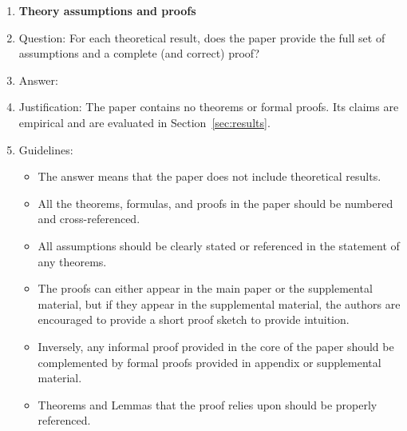 \begin{enumerate}
\begin{itemize}
        \item If applicable, the authors should discuss possible limitations of their approach to address problems of privacy and fairness.
        \item While the authors might fear that complete honesty about limitations might be used by reviewers as grounds for rejection, a worse outcome might be that reviewers discover limitations that aren't acknowledged in the paper. The authors should use their best judgment and recognize that individual actions in favor of transparency play an important role in developing norms that preserve the integrity of the community. Reviewers will be specifically instructed to not penalize honesty concerning limitations.
    \end{itemize}

\item {\bf Theory assumptions and proofs}
    \item[] Question: For each theoretical result, does the paper provide the full set of assumptions and a complete (and correct) proof?
    \item[] Answer: \answerNA{}
    \item[] Justification: The paper contains no theorems or formal proofs. Its claims are empirical and are evaluated in Section~\ref{sec:results}.
    \item[] Guidelines:
    \begin{itemize}
        \item The answer \answerNA{} means that the paper does not include theoretical results. 
        \item All the theorems, formulas, and proofs in the paper should be numbered and cross-referenced.
        \item All assumptions should be clearly stated or referenced in the statement of any theorems.
        \item The proofs can either appear in the main paper or the supplemental material, but if they appear in the supplemental material, the authors are encouraged to provide a short proof sketch to provide intuition. 
        \item Inversely, any informal proof provided in the core of the paper should be complemented by formal proofs provided in appendix or supplemental material.
        \item Theorems and Lemmas that the proof relies upon should be properly referenced. 
    \end{itemize}


\end{enumerate}
